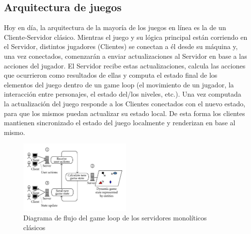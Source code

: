 \subsection{Arquitectura de juegos}
\noindent Hoy en día, la arquitectura de la mayoría de los juegos en línea es la de un Cliente-Servidor clásico. 
Mientras el juego y su lógica principal están corriendo en el Servidor, distintos jugadores (Clientes) 
se conectan a él desde su máquina y, una vez conectados, comenzarán a enviar actualizaciones al 
Servidor en base a las acciones del jugador. El Servidor recibe estas actualizaciones, 
calcula las acciones que ocurrieron como resultados de ellas y computa el estado final de los 
elementos del juego dentro de un game loop (el movimiento de un jugador, la interacción entre 
personajes, el estado del/los niveles, etc.). Una vez computada la actualización del juego 
responde a los Clientes conectados con el nuevo estado, para que los mismos puedan actualizar 
su estado local. De esta forma los clientes mantienen sincronizado el estado del juego localmente 
y renderizan en base al mismo.

\begin{figure}[htbp]
    \centering
    \includegraphics[width=0.5\textwidth]{../assets/monolith-server-game-loop.png}
    \caption{Diagrama de flujo del game loop de los servidores monolíticos clásicos}
\end{figure}
